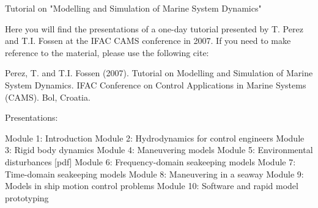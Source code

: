

Tutorial on "Modelling and Simulation of Marine System Dynamics"

Here you will find the presentations of a one-day tutorial presented by T. Perez and T.I. Fossen at the IFAC CAMS conference in 2007.   If you need to make reference to the material, please use the following cite:

Perez, T. and T.I. Fossen (2007). Tutorial on Modelling and Simulation of Marine System Dynamics.
IFAC Conference on Control Applications in Marine Systems (CAMS). Bol, Croatia.

Presentations:

Module 1:    Introduction
Module 2:    Hydrodynamics for control engineers
Module 3:    Rigid body dynamics
Module 4:    Maneuvering models
Module 5:    Environmental disturbances [pdf]
Module 6:    Frequency-domain seakeeping models
Module 7:    Time-domain seakeeping models
Module 8:    Maneuvering in a seaway
Module 9:    Models in ship motion control problems
Module 10:   Software and rapid model prototyping

